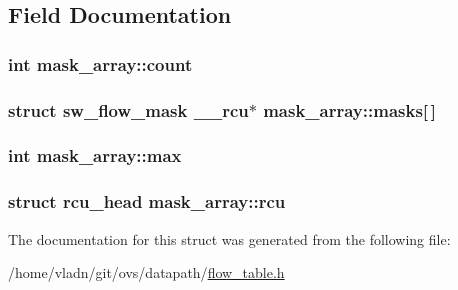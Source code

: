 \subsection{Field Documentation}
\hypertarget{structmask__array_a55b8fb7e2d7ad8a5725a749645f73b5a}{}
\subsubsection[{count}]{\setlength{\rightskip}{0pt plus 5cm}int mask\+\_\+array\+::count}\label{structmask__array_a55b8fb7e2d7ad8a5725a749645f73b5a}
\hypertarget{structmask__array_a92da2b0ebde32eb6f76a134dc2d61d79}{}
\subsubsection[{masks}]{\setlength{\rightskip}{0pt plus 5cm}struct {\bf sw\+\_\+flow\+\_\+mask} {\bf \+\_\+\+\_\+rcu}$\ast$ mask\+\_\+array\+::masks\mbox{[}$\,$\mbox{]}}\label{structmask__array_a92da2b0ebde32eb6f76a134dc2d61d79}
\hypertarget{structmask__array_ad981d54486b5dd03bdb4ad20b740171e}{}
\subsubsection[{max}]{\setlength{\rightskip}{0pt plus 5cm}int mask\+\_\+array\+::max}\label{structmask__array_ad981d54486b5dd03bdb4ad20b740171e}
\hypertarget{structmask__array_ac1e5ee290959115397221781b7ad1c6e}{}
\subsubsection[{rcu}]{\setlength{\rightskip}{0pt plus 5cm}struct rcu\+\_\+head mask\+\_\+array\+::rcu}\label{structmask__array_ac1e5ee290959115397221781b7ad1c6e}


The documentation for this struct was generated from the following file\+:\begin{DoxyCompactItemize}
\item 
/home/vladn/git/ovs/datapath/\hyperlink{flow__table_8h}{flow\+\_\+table.\+h}\end{DoxyCompactItemize}
